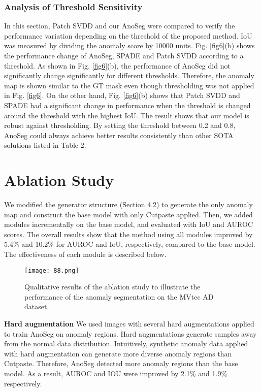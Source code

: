 \documentclass{article} \usepackage{iclr2022_conference,times}
\begin{document}
\subsubsection{Analysis of Threshold Sensitivity}
In this section, Patch SVDD and our AnoSeg were compared to verify the performance variation depending on the threshold of the proposed method. IoU was measured by dividing the anomaly score by 10000 units. Fig. \ref{fig6}(b) shows the performance change of AnoSeg, SPADE and Patch SVDD according to a threshold. As shown in Fig. \ref{fig6}(b), the performance of AnoSeg did not significantly change significantly for different thresholds. Therefore, the anomaly map is shown similar to the GT mask even though thresholding was not applied in Fig. \ref{fig6}. On the other hand, Fig. \ref{fig6}(b) shows that Patch SVDD and SPADE had a significant change in performance when the threshold is changed around the threshold with the highest IoU. The result shows that our model is robust against thresholding. By setting the threshold between 0.2 and 0.8, AnoSeg could always achieve better results consistently than other SOTA solutions listed in Table 2.


\section{Ablation Study} 
We modified the generator structure (Section 4.2) to generate the only anomaly map and construct the base model with only Cutpaste applied. Then, we added modules incrementally on the base model, and evaluated with IoU and AUROC scores. The overall results show that the method using all modules improved by 5.4\% and 10.2\% for AUROC and IoU, respectively, compared to the base model. The effectiveness of each module is described below.\\


\begin{figure}[t]
\begin{center}
\texttt{[image: 88.png]} 

\end{center}
\vspace{-0.2cm}
\caption{Qualitative results of the ablation study to illustrate the performance of the anomaly segmentation on the MVtec AD dataset.}
\vspace{-0.2cm}
\label{fig3}
\end{figure}

\textbf{Hard augmentation} \quad We used images with several hard augmentations applied to train AnoSeg on anomaly regions. Hard augmentations generate samples away from the normal data distribution. Intuitively, synthetic anomaly data applied with hard augmentation can generate more diverse anomaly regions than Cutpaste. Therefore, AnoSeg detected more anomaly regions than the base model. As a result, AUROC and IOU were improved by 2.1\% and 1.9\% respectively.
\end{document}

